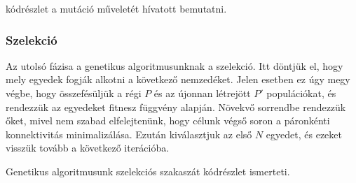  kódrészlet a mutáció műveletét hívatott bemutatni.



\subsubsection{Szelekció}
Az utolsó fázisa a genetikus algoritmusunknak a szelekció.
Itt döntjük el, hogy mely egyedek fogják alkotni a következő nemzedéket.
Jelen esetben ez úgy megy végbe, hogy összefésüljük a régi $P$ és az újonnan létrejött $P'$ populációkat,
és rendezzük az egyedeket  fitnesz függvény alapján.
Növekvő sorrendbe rendezzük őket, mivel nem szabad elfelejtenünk, hogy célunk végső soron a páronkénti konnektivitás minimalizálása.
Ezután kiválasztjuk az első $N$ egyedet, és ezeket visszük tovább a következő iterációba.

Genetikus algoritmusunk szelekciós szakaszát  kódrészlet ismerteti.

